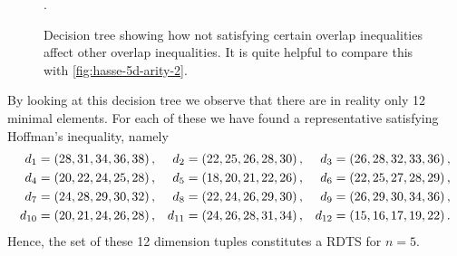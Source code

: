\begin{example}[RDTS for $n = 5$]
\begin{figure}[ht]
    \caption{Decision tree showing how not satisfying certain overlap inequalities affect other overlap inequalities. It is quite helpful to compare this with \cref{fig:hasse-5d-arity-2}.}.
    \label{fig:5d-decision-tree}
\end{figure}
By looking at this decision tree we observe that there are in reality only 12 minimal elements. For each of these we have found a representative satisfying Hoffman's inequality, namely
\[
\begin{aligned}[c]
d_1 &= \left( 28, 31, 34, 36, 38 \right),\\
d_4 &= \left( 20, 22, 24, 25, 28 \right),\\
d_7 &= \left( 24, 28, 29, 30, 32 \right),\\
d_{10} &= \left( 20, 21, 24, 26, 28 \right),
\end{aligned}
\quad
\begin{aligned}[c]
d_2 &= \left( 22, 25, 26, 28, 30 \right),\\
d_5 &= \left( 18, 20, 21, 22, 26 \right),\\
d_8 &= \left( 22, 24, 26, 29, 30 \right),\\
d_{11} &= \left( 24, 26, 28, 31, 34 \right),
\end{aligned}
\quad
\begin{aligned}[c]
d_3 &= \left( 26, 28, 32, 33, 36 \right),\\
d_6 &= \left( 22, 25, 27, 28, 29 \right),\\
d_9 &= \left( 26, 29, 30, 34, 36 \right),\\
d_{12} &= \left( 15, 16, 17, 19, 22 \right).
\end{aligned}
\]
Hence, the set of these 12 dimension tuples constitutes a RDTS for $n = 5$.
\end{example}

